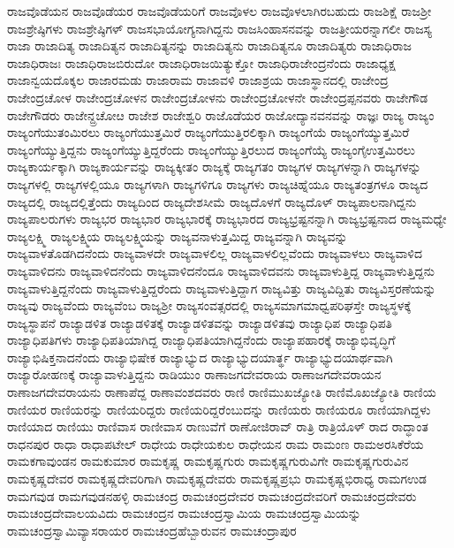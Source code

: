 {ರಾಜವೊಡೆಯನ
ರಾಜವೊಡೆಯರ
ರಾಜವೊಡೆಯರಿಗೆ
ರಾಜವೊಳಲ
ರಾಜವೊಳಲಾಗಿರಬಹುದು
ರಾಜಶಿಕ್ಷೆ
ರಾಜಶ್ರೀ
ರಾಜಶ್ರೇಷ್ಠಿಗಳು
ರಾಜಶ್ರೇಷ್ಠಿಗಳ್
ರಾಜಸಭಾಯೋಗ್ಯನಾಗಿದ್ದನು
ರಾಜಸಿಂಹಾಸನವನ್ನು
ರಾಜತ್ರೀಯರನ್ನಾಗಲೀ
ರಾಜಸ್ಯ
ರಾಜಾ
ರಾಜಾದಿತ್ಯ
ರಾಜಾದಿತ್ಯನ
ರಾಜಾದಿತ್ಯನನ್ನು
ರಾಜಾದಿತ್ಯನು
ರಾಜಾದಿತ್ಯನೂ
ರಾಜಾದಿತ್ಯರು
ರಾಜಾಧಿರಾಜ
ರಾಜಾಧಿರಾಜಃ
ರಾಜಾಧಿರಾಜಬಿರುದೋ
ರಾಜಾಧಿರಾಜಯಿತ್ಯುಕ್ತೋ
ರಾಜಾಧಿರಾಜೇಂದ್ರನೆಂದು
ರಾಜಾಧ್ಯಕ್ಷ
ರಾಜಾನ್ವಯದೊಕ್ಕಲ
ರಾಜಾರಮಡು
ರಾಜಾರಾಮ
ರಾಜಾವಳಿ
ರಾಜಾಶ್ರಯ
ರಾಜಾಸ್ಥಾನದಲ್ಲಿ
ರಾಜೇಂದ್ರ
ರಾಜೇಂದ್ರಚೋಳ
ರಾಜೇಂದ್ರಚೋಳನ
ರಾಜೇಂದ್ರಚೋಳನು
ರಾಜೇಂದ್ರಚೋಳನೇ
ರಾಜೇಂದ್ರಪ್ಪನವರು
ರಾಜೇಗೌಡ
ರಾಜೇಗೌಡರು
ರಾಜೇನ್ದ್ರಚೋೞ
ರಾಜೇಶ
ರಾಜೇಶ್ವರಿ
ರಾಜೊಡೆಯರ
ರಾಜೋದ್ಯಾನವನವನ್ನು
ರಾಜ್ಞಃ
ರಾಜ್ಯ
ರಾಜ್ಯಂ
ರಾಜ್ಯಂಗೆಯುತಂಮಿರಲು
ರಾಜ್ಯಂಗೆಯುತ್ತಮಿರೆ
ರಾಜ್ಯಂಗೆಯುತ್ತಿರಲಿಕ್ಕಾಗಿ
ರಾಜ್ಯಂಗೆಯೆ
ರಾಜ್ಯಂಗೆಯ್ಯುತ್ತಮಿರೆ
ರಾಜ್ಯಂಗೆಯ್ಯುತ್ತಿದ್ದನು
ರಾಜ್ಯಂಗೆಯ್ಯುತ್ತಿದ್ದರೆಂದು
ರಾಜ್ಯಂಗೆಯ್ಯುತ್ತಿರಲುದ
ರಾಜ್ಯಂಗೆಯ್ಯೆ
ರಾಜ್ಯಂಗೈಉತ್ತಮಿರಲು
ರಾಜ್ಯಕಾರ್ಯಕ್ಕಾಗಿ
ರಾಜ್ಯಕಾರ್ಯವನ್ನು
ರಾಜ್ಯಕ್ಕೀತಂ
ರಾಜ್ಯಕ್ಕೆ
ರಾಜ್ಯಗತಂ
ರಾಜ್ಯಗಳ
ರಾಜ್ಯಗಳನ್ನಾಗಿ
ರಾಜ್ಯಗಳನ್ನು
ರಾಜ್ಯಗಳಲ್ಲಿ
ರಾಜ್ಯಗಳಲ್ಲಿಯೂ
ರಾಜ್ಯಗಳಾಗಿ
ರಾಜ್ಯಗಳಿಗೂ
ರಾಜ್ಯಗಳು
ರಾಜ್ಯಚಿಹ್ನೆಯೂ
ರಾಜ್ಯತಂತ್ರಗಳೂ
ರಾಜ್ಯದ
ರಾಜ್ಯದಲ್ಲಿ
ರಾಜ್ಯದಲ್ಲಿತ್ತೆಂದು
ರಾಜ್ಯದಿಂದ
ರಾಜ್ಯದೇಶಸೀಮೆ
ರಾಜ್ಯದೊಳಗೆ
ರಾಜ್ಯದೊಳ್
ರಾಜ್ಯಪಾಲನಾಗಿದ್ದನು
ರಾಜ್ಯಪಾಲರುಗಳು
ರಾಜ್ಯಭರ
ರಾಜ್ಯಭಾರ
ರಾಜ್ಯಭಾರಕ್ಕೆ
ರಾಜ್ಯಭಾರದ
ರಾಜ್ಯಭ್ರಷ್ಟನನ್ನಾಗಿ
ರಾಜ್ಯಭ್ರಷ್ಟನಾದ
ರಾಜ್ಯಮಧ್ಯೇ
ರಾಜ್ಯಲಕ್ಷ್ಮಿ
ರಾಜ್ಯಲಕ್ಷ್ಮಿಯ
ರಾಜ್ಯಲಕ್ಷ್ಮಿಯನ್ನು
ರಾಜ್ಯವನಾಳುತ್ತಮಿದ್ದ
ರಾಜ್ಯವನ್ನಾಗಿ
ರಾಜ್ಯವನ್ನು
ರಾಜ್ಯವಾಳತೊಡಗಿದನೆಂದು
ರಾಜ್ಯವಾಳದೇ
ರಾಜ್ಯವಾಳಲಿಲ್ಲ
ರಾಜ್ಯವಾಳಲಿಲ್ಲವೆಂದು
ರಾಜ್ಯವಾಳಲು
ರಾಜ್ಯವಾಳಿದ
ರಾಜ್ಯವಾಳಿದನು
ರಾಜ್ಯವಾಳಿದನೆಂದು
ರಾಜ್ಯವಾಳಿದನೆಂದೂ
ರಾಜ್ಯವಾಳಿದವನು
ರಾಜ್ಯವಾಳುತ್ತಿದ್ದ
ರಾಜ್ಯವಾಳುತ್ತಿದ್ದನು
ರಾಜ್ಯವಾಳುತ್ತಿದ್ದನೆಂದು
ರಾಜ್ಯವಾಳುತ್ತಿದ್ದರೆಂದು
ರಾಜ್ಯವಾಳುತ್ತಿದ್ದಾಗ
ರಾಜ್ಯವಿತ್ತು
ರಾಜ್ಯವಿದ್ದಿತು
ರಾಜ್ಯವಿಸ್ತರಣೆಯನ್ನು
ರಾಜ್ಯವು
ರಾಜ್ಯವೆಂದು
ರಾಜ್ಯವೆಂಬ
ರಾಜ್ಯಶ್ರೀ
ರಾಜ್ಯಸಂವತ್ಸರದಲ್ಲಿ
ರಾಜ್ಯಸಮಾಗಮಾಧ್ವಪರಿಘಸ್ತೇ
ರಾಜ್ಯಸ್ಥಳಕ್ಕೆ
ರಾಜ್ಯಸ್ಥಾಪನೆ
ರಾಜ್ಯಾಡಳಿತ
ರಾಜ್ಯಾಡಳಿತಕ್ಕೆ
ರಾಜ್ಯಾಡಳಿತವನ್ನು
ರಾಜ್ಯಾಡಳಿತವು
ರಾಜ್ಯಾಧಿಪ
ರಾಜ್ಯಾಧಿಪತಿ
ರಾಜ್ಯಾಧಿಪತಿಗಳು
ರಾಜ್ಯಾಧಿಪತಿಯಾಗಿದ್ದ
ರಾಜ್ಯಾಧಿಪತಿಯಾಗಿದ್ದನೆಂದು
ರಾಜ್ಯಾಪಹಾರಕ್ಕೆ
ರಾಜ್ಯಾಭಿವೃದ್ಧಿಗೆ
ರಾಜ್ಯಾಭಿಷಿಕ್ತನಾದನೆಂದು
ರಾಜ್ಯಾಭಿಷೇಕ
ರಾಜ್ಯಾಭ್ಯುದ
ರಾಜ್ಯಾಭ್ಯುದಯಾರ್ತ್ಥ
ರಾಜ್ಯಾಭ್ಯುದಯಾರ್ಥವಾಗಿ
ರಾಜ್ಯಾರೋಹಣಕ್ಕೆ
ರಾಜ್ಯಾವಾಳುತ್ತಿದ್ದನು
ರಾಡಿಯುಂ
ರಾಣಾಜಗದೇವರಾಯ
ರಾಣಾಜಗದೇವರಾಯನ
ರಾಣಾಜಗದೇವರಾಯನು
ರಾಣಾಪೆದ್ದ
ರಾಣಾವಂಶದವರು
ರಾಣಿ
ರಾಣಿಮುಖಜ್ಯೋತಿ
ರಾಣಿಮೊಖಜ್ಯೋತಿ
ರಾಣಿಯ
ರಾಣಿಯರ
ರಾಣಿಯರನ್ನು
ರಾಣಿಯರಿದ್ದರು
ರಾಣಿಯರಿದ್ದರೆಂಬುದನ್ನು
ರಾಣಿಯರು
ರಾಣಿಯರೂ
ರಾಣಿಯಾಗಿದ್ದಳು
ರಾಣಿಯಾದ
ರಾಣಿಯು
ರಾಣಿವಾಸ
ರಾಣೀವಾಸ
ರಾಣುವೆಗೆ
ರಾಣೋಜಿರಾವ್
ರಾತ್ರಿ
ರಾತ್ರಿಯೊಳ್
ರಾದ
ರಾದ್ಧಾಂತ
ರಾಧನಪುರ
ರಾಧಾ
ರಾಧಾಪಟೇಲ್
ರಾಧೇಯ
ರಾಧೇಯಕುಲ
ರಾಧೇಯನ
ರಾಮ
ರಾಮಂಣ
ರಾಮಅರಸಿಕೆರೆಯ
ರಾಮಕಗಾವುಂಡನ
ರಾಮಕುಮಾರ
ರಾಮಕೃಷ್ಣ
ರಾಮಕೃಷ್ಣಗುರು
ರಾಮಕೃಷ್ಣಗುರುವಿಗೇ
ರಾಮಕೃಷ್ಣಗುರುವಿನ
ರಾಮಕೃಷ್ಣದೇವರ
ರಾಮಕೃಷ್ಣದೇವರಿಗಾಗಿ
ರಾಮಕೃಷ್ಣದೇವರು
ರಾಮಕೃಷ್ಣಪ್ರಭು
ರಾಮಕೃಷ್ಣಭಿರಾಧ್ಯ
ರಾಮಗಉಡ
ರಾಮಗವುಡ
ರಾಮಗವುಡನಹಳ್ಳಿ
ರಾಮಚಂದ್ರ
ರಾಮಚಂದ್ರದೇವರ
ರಾಮಚಂದ್ರದೇವರಿಗೆ
ರಾಮಚಂದ್ರದೇವರು
ರಾಮಚಂದ್ರದೇವಾಲಯವಿದು
ರಾಮಚಂದ್ರನ
ರಾಮಚಂದ್ರಸ್ವಾಮಿಯ
ರಾಮಚಂದ್ರಸ್ವಾಮಿಯನ್ನು
ರಾಮಚಂದ್ರಸ್ವಾಮಿವ್ಯಾಸರಾಯರ
ರಾಮಚಂದ್ರಹೆಬ್ಬಾರುವನ
ರಾಮಚಂದ್ರಾಪುರ
}

